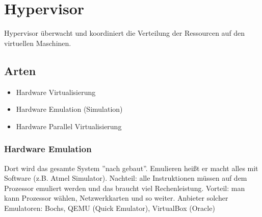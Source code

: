 \documentclass[a4paper]{report}
\begin{document}
\section{Hypervisor}

Hypervisor überwacht und koordiniert die Verteilung der Ressourcen auf den virtuellen Maschinen. 

 \subsection{Arten}
 
\begin{itemize}
\item Hardware Virtualisierung
\item Hardware Emulation (Simulation)
\item Hardware Parallel Virtualisierung
\end{itemize}


\subsubsection{Hardware Emulation}

Dort wird das gesamte System ''nach gebaut''. Emulieren heißt er macht alles mit Software (z.B. Atmel Simulator). Nachteil: alle Instruktionen müssen auf dem Prozessor emuliert werden und das braucht viel Rechenleistung. Vorteil: man kann Prozessor wählen, Netzwerkkarten und so weiter.
\newline
Anbieter solcher Emulatoren: Bochs, QEMU (Quick Emulator), VirtualBox (Oracle)
\end{document}
